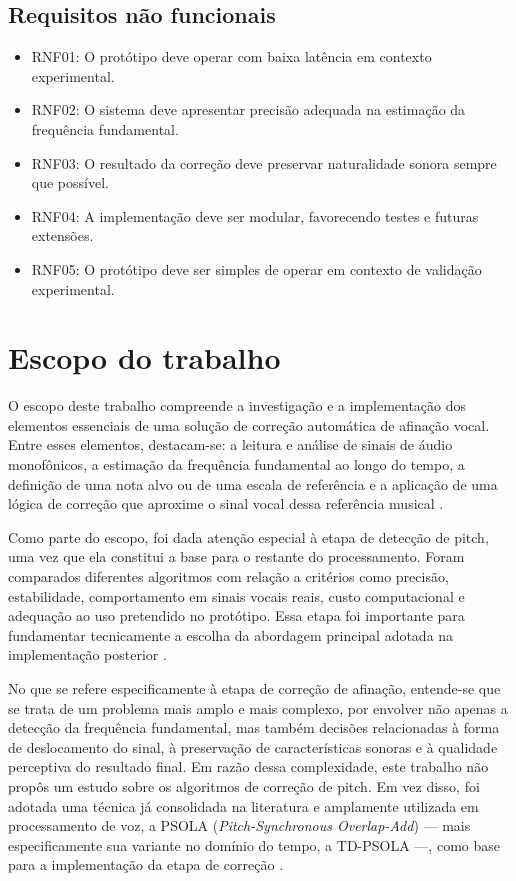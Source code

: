 \subsection{Requisitos não funcionais}

\begin{itemize}
    \item RNF01: O protótipo deve operar com baixa latência em contexto experimental.
    \item RNF02: O sistema deve apresentar precisão adequada na estimação da frequência fundamental.
    \item RNF03: O resultado da correção deve preservar naturalidade sonora sempre que possível.
    \item RNF04: A implementação deve ser modular, favorecendo testes e futuras extensões.
    \item RNF05: O protótipo deve ser simples de operar em contexto de validação experimental.
\end{itemize}

\section{Escopo do trabalho}

O escopo deste trabalho compreende a investigação e a implementação dos elementos essenciais de uma solução de correção automática de afinação vocal. Entre esses elementos, destacam-se: a leitura e análise de sinais de áudio monofônicos, a estimação da frequência fundamental ao longo do tempo, a definição de uma nota alvo ou de uma escala de referência e a aplicação de uma lógica de correção que aproxime o sinal vocal dessa referência musical \cite{aalto_f0_estimation}.

Como parte do escopo, foi dada atenção especial à etapa de detecção de pitch, uma vez que ela constitui a base para o restante do processamento. Foram comparados diferentes algoritmos com relação a critérios como precisão, estabilidade, comportamento em sinais vocais reais, custo computacional e adequação ao uso pretendido no protótipo. Essa etapa foi importante para fundamentar tecnicamente a escolha da abordagem principal adotada na implementação posterior \cite{delacuadra2007pitch}.

No que se refere especificamente à etapa de correção de afinação, entende-se que se trata de um problema mais amplo e mais complexo, por envolver não apenas a detecção da frequência fundamental, mas também decisões relacionadas à forma de deslocamento do sinal, à preservação de características sonoras e à qualidade perceptiva do resultado final. Em razão dessa complexidade, este trabalho não propôs um estudo sobre os algoritmos de correção de pitch. Em vez disso, foi adotada uma técnica já consolidada na literatura e amplamente utilizada em processamento de voz, a PSOLA (\textit{Pitch-Synchronous Overlap-Add}) --- mais especificamente sua variante no domínio do tempo, a TD-PSOLA ---, como base para a implementação da etapa de correção \cite{moulines1990psola,aalto_psola}.

